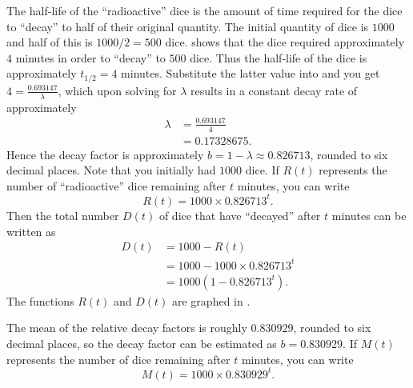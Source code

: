\documentclass[a4paper,oneside,12pt]{article}
\begin{document}
\begin{problem}
{\begin{solution}
The half-life of the ``radioactive'' dice is the amount of time
required for the dice to ``decay'' to half of their original quantity.
The initial quantity of dice is $1000$ and half of this is
$1000 / 2 = 500$ dice.  
shows that the dice required approximately $4$ minutes in order to
``decay'' to $500$ dice.  Thus the half-life of the dice is
approximately $t_{1/2} = 4$ minutes.  Substitute the latter value into
 and you get
$4 = \frac{0.693147}{\lambda}$, which upon solving for $\lambda$
results in a constant decay rate of approximately
\begin{align*}
\lambda
&=
\frac{0.693147}{4} \\[4pt]
&=
0.17328675.
\end{align*}
Hence the decay factor is approximately
$b = 1 - \lambda \approx 0.826713$, rounded to six decimal places.
Note that you initially had $1000$ dice.  If $R(t)$ represents the
number of ``radioactive'' dice remaining after $t$ minutes, you can
write
\begin{equation}
\label{eqn:exponential:radioactive_dice_decay_constant_formula}
R(t)
=
1000 \times 0.826713^t.
\end{equation}
Then the total number $D(t)$ of dice that have ``decayed'' after $t$
minutes can be written as
\begin{equation}
\label{eqn:exponential:radioactive_dice_total_decayed}
\begin{aligned}
D(t)
&=
1000 - R(t) \\[4pt]
&=
1000 - 1000 \times 0.826713^t \\[4pt]
&=
1000(1 - 0.826713^t).
\end{aligned}
\end{equation}
The functions $R(t)$ and $D(t)$ are graphed in
.

The mean of the relative decay factors is roughly $0.830929$, rounded
to six decimal places, so the decay factor can be estimated as
$b = 0.830929$.  If $M(t)$ represents the number of dice remaining
after $t$ minutes, you can write
\begin{equation}
\label{eqn:exponential:radioactive_dice_mean_decay_rate}
M(t)
=
1000 \times 0.830929^t.
\end{equation}


\end{solution}}
\end{problem}
\end{document}
